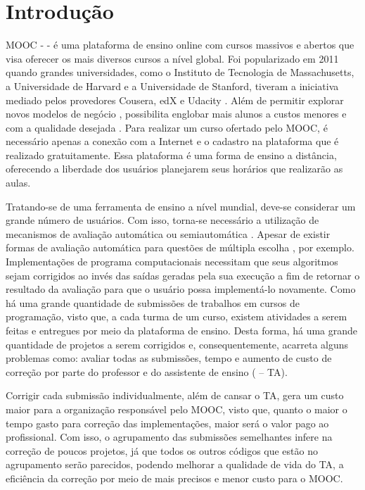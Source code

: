 \chapter{Introdução}

	MOOC -  - é uma plataforma de ensino online
	com cursos massivos e abertos que visa oferecer os mais diversos cursos a nível global.
	Foi popularizado em 2011 quando grandes universidades, como o Instituto de Tecnologia de
	Massachusetts, a Universidade de Harvard e a Universidade de Stanford, tiveram a
	iniciativa mediado pelos provedores Cousera, edX e Udacity \cite{Mehlenbacher:2012}.
	Além de permitir explorar novos modelos de negócio \cite{dellarocas2013money},
	possibilita englobar mais alunos a custos menores e com a qualidade desejada
	\cite{schmidt2013producing}. Para realizar um curso ofertado pelo MOOC, é necessário
	apenas a conexão com a Internet e o cadastro na plataforma que é realizado gratuitamente.
	Essa plataforma é uma forma de ensino a	distância, oferecendo a liberdade dos usuários
	planejarem seus horários que realizarão as aulas. 
	
	Tratando-se de uma ferramenta de ensino a nível mundial, deve-se considerar um
	grande número de usuários. Com isso, torna-se necessário a utilização de mecanismos
	de avaliação automática ou semiautomática \cite{schmidt2013producing}. Apesar de
	existir formas de avaliação automática para questões de múltipla escolha
	\cite{alario2013analysing}, por exemplo. Implementações de programa computacionais
	necessitam que seus algoritmos sejam corrigidos ao invés das saídas geradas pela sua
	execução a fim de retornar o resultado da avaliação para que o usuário possa
	implementá-lo novamente. Como há uma grande quantidade de submissões de trabalhos em
	cursos de programação, visto que, a cada turma de um curso, existem atividades a
	serem feitas e entregues por meio da plataforma de ensino. Desta forma, há uma grande
	quantidade de projetos a serem corrigidos e, consequentemente, acarreta alguns
	problemas como: avaliar todas as submissões, tempo e aumento de custo de correção por
	parte do professor e do assistente de ensino ( – TA).
	
	
	Corrigir cada submissão individualmente, além de cansar o TA, gera um custo maior
	para a organização responsável pelo MOOC, visto que, quanto o maior o tempo gasto
	para correção das implementações, maior será o valor pago ao profissional. Com
	isso, o agrupamento das submissões semelhantes infere na correção de poucos
	projetos, já que todos os outros códigos que estão no agrupamento serão
	parecidos, podendo melhorar a qualidade de vida do TA, a eficiência da correção
	por meio de  mais precisos e menor custo para o MOOC.
	
